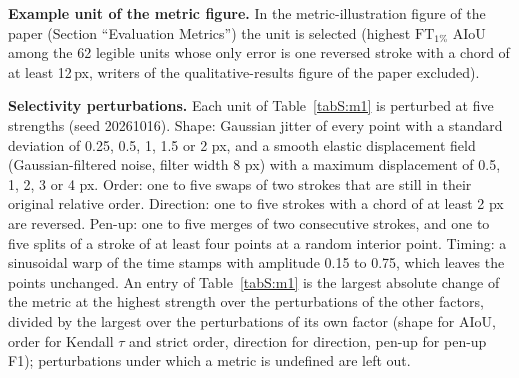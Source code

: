 \documentclass[10pt,a4paper]{article}
\newcommand{\FT}[1]{\mathrm{FT}_{#1}}
\begin{document}
\textbf{Example unit of the metric figure.} In the metric-illustration figure of the paper (Section ``Evaluation Metrics'') the unit is selected (highest $\FT{1\%}$ AIoU among the 62 legible units whose only error is one reversed stroke with a chord of at least 12\,px, writers of the qualitative-results figure of the paper excluded).

\textbf{Selectivity perturbations.} Each unit of Table~\ref{tabS:m1} is perturbed at five strengths (seed 20261016). Shape: Gaussian jitter of every point with a standard deviation of 0.25, 0.5, 1, 1.5 or 2 px, and a smooth elastic displacement field (Gaussian-filtered noise, filter width 8 px) with a maximum displacement of 0.5, 1, 2, 3 or 4 px. Order: one to five swaps of two strokes that are still in their original relative order. Direction: one to five strokes with a chord of at least 2 px are reversed. Pen-up: one to five merges of two consecutive strokes, and one to five splits of a stroke of at least four points at a random interior point. Timing: a sinusoidal warp of the time stamps with amplitude 0.15 to 0.75, which leaves the points unchanged. An entry of Table~\ref{tabS:m1} is the largest absolute change of the metric at the highest strength over the perturbations of the other factors, divided by the largest over the perturbations of its own factor (shape for AIoU, order for Kendall $\tau$ and strict order, direction for direction, pen-up for pen-up F1); perturbations under which a metric is undefined are left out.
\end{document}
